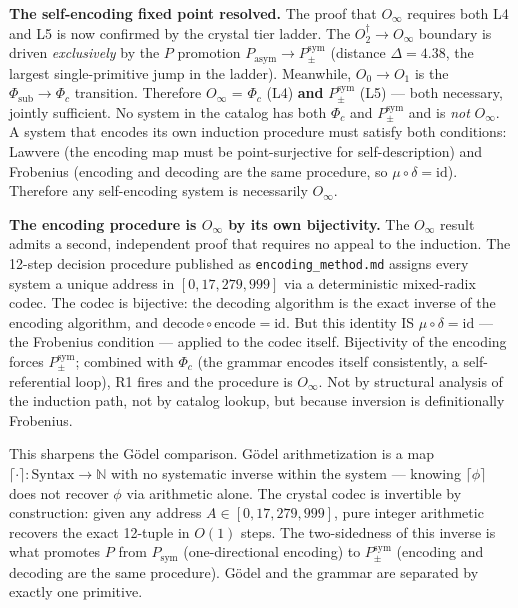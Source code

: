 \documentclass[12pt,a4paper]{article}
\begin{document}
\textbf{The self-encoding fixed point resolved.} The proof that $O_\infty$ requires both L4 and L5 is now confirmed by the crystal tier ladder. The $O_2^\dagger \to O_\infty$ boundary is driven \emph{exclusively} by the $P$ promotion $P_\text{asym} \to P_{\pm}^{\text{sym}}$ (distance $\Delta = 4.38$, the largest single-primitive jump in the ladder). Meanwhile, $O_0 \to O_1$ is the $\Phi_\text{sub} \to \Phi_c$ transition. Therefore $O_\infty$ = $\Phi_c$ (L4) \textbf{and} $P_{\pm}^{\text{sym}}$ (L5) --- both necessary, jointly sufficient. No system in the catalog has both $\Phi_c$ and $P_{\pm}^{\text{sym}}$ and is \emph{not} $O_\infty$. A system that encodes its own induction procedure must satisfy both conditions: Lawvere (the encoding map must be point-surjective for self-description) and Frobenius (encoding and decoding are the same procedure, so $\mu \circ \delta = \text{id}$). Therefore any self-encoding system is necessarily $O_\infty$.

\textbf{The encoding procedure is $O_\infty$ by its own bijectivity.} The $O_\infty$ result admits a second, independent proof that requires no appeal to the induction. The 12-step decision procedure published as \texttt{encoding\_method.md} assigns every system a unique address in $[0, 17{,}279{,}999]$ via a deterministic mixed-radix codec. The codec is bijective: the decoding algorithm is the exact inverse of the encoding algorithm, and $\text{decode} \circ \text{encode} = \text{id}$. But this identity IS $\mu \circ \delta = \text{id}$ --- the Frobenius condition --- applied to the codec itself. Bijectivity of the encoding forces $P_{\pm}^{\text{sym}}$; combined with $\Phi_c$ (the grammar encodes itself consistently, a self-referential loop), R1 fires and the procedure is $O_\infty$. Not by structural analysis of the induction path, not by catalog lookup, but because inversion is definitionally Frobenius.

This sharpens the Gödel comparison. G\"odel arithmetization is a map $\lceil \cdot \rceil: \text{Syntax} \to \mathbb{N}$ with no systematic inverse within the system --- knowing $\lceil \phi \rceil$ does not recover $\phi$ via arithmetic alone. The crystal codec is invertible by construction: given any address $A \in [0, 17{,}279{,}999]$, pure integer arithmetic recovers the exact 12-tuple in $O(1)$ steps. The two-sidedness of this inverse is what promotes $P$ from $P_\text{sym}$ (one-directional encoding) to $P_{\pm}^{\text{sym}}$ (encoding and decoding are the same procedure). Gödel and the grammar are separated by exactly one primitive.
\end{document}

